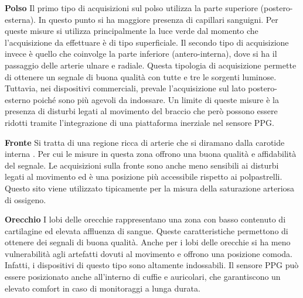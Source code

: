 \textbf{Polso}  Il primo tipo di acquisizioni sul polso utilizza la parte superiore (postero-esterna). In questo punto si ha maggiore presenza di capillari sanguigni. Per queste misure si utilizza principalmente la luce verde dal momento che l'acquisizione da effettuare è di tipo superficiale.	 Il secondo tipo di acquisizione invece è quello che coinvolge la parte inferiore (antero-interna), dove si ha il passaggio delle arterie ulnare e radiale. Questa tipologia di acquisizione permette di ottenere un segnale di buona qualità con tutte e tre le sorgenti luminose. Tuttavia, nei dispositivi commerciali, prevale l'acquisizione sul lato postero-esterno poiché sono più agevoli da indossare. Un limite di queste misure è la presenza di disturbi legati al movimento del braccio che però possono essere ridotti tramite l'integrazione di una piattaforma inerziale nel sensore PPG\cite{Ghamari2018}.

\textbf{Fronte} Si tratta di una regione ricca di arterie che si diramano dalla carotide interna \cite{Abay2019}. Per cui le misure in questa zona offrono una buona qualità e affidabilità del segnale. Le acquisizioni sulla fronte sono anche meno sensibili ai disturbi legati al movimento ed è una posizione più accessibile rispetto ai polpastrelli. Questo sito viene utilizzato tipicamente per la misura della saturazione arteriosa di ossigeno.

\textbf{Orecchio} I lobi delle orecchie rappresentano una zona con basso contenuto di cartilagine ed elevata affluenza di sangue. Queste caratteristiche permettono di ottenere dei segnali di buona qualità. Anche per i lobi delle orecchie si ha meno vulnerabilità agli artefatti dovuti al movimento e offrono una posizione comoda. Infatti, i dispositivi di questo tipo sono altamente indossabili\cite{Ghamari2018}. Il sensore PPG può essere posizionato anche all'interno di cuffie e auricolari, che garantiscono un elevato comfort in caso di monitoraggi a lunga durata.

 